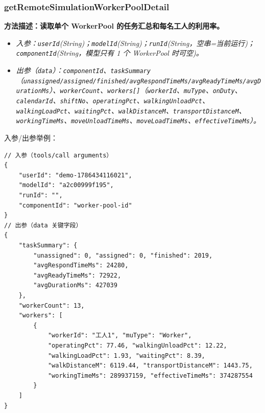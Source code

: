 \subsubsection{getRemoteSimulationWorkerPoolDetail}
\bf{方法描述}：读取单个 WorkerPool 的任务汇总和每名工人的利用率。
\begin{itemize}
	\item \it{入参}：\texttt{userId}(String)；\texttt{modelId}(String)；\texttt{runId}(String，空串=当前运行)；\texttt{componentId}(String，模型只有 1 个 WorkerPool 时可空)。
	\item \it{出参}（\texttt{data}）：\texttt{componentId}、\texttt{taskSummary}（\texttt{unassigned/assigned/finished/avgRespondTimeMs/avgReadyTimeMs/avgDurationMs}）、\texttt{workerCount}、\texttt{workers[]}（\texttt{workerId}、\texttt{muType}、\texttt{onDuty}、\texttt{calendarId}、\texttt{shiftNo}、\texttt{operatingPct}、\texttt{walkingUnloadPct}、\texttt{walkingLoadPct}、\texttt{waitingPct}、\texttt{walkDistanceM}、\texttt{transportDistanceM}、\texttt{workingTimeMs}、\texttt{moveUnloadTimeMs}、\texttt{moveLoadTimeMs}、\texttt{effectiveTimeMs}）。
\end{itemize}
入参/出参举例：
\begin{lstlisting}
// 入参（tools/call arguments）
{
    "userId": "demo-1786434116021",
    "modelId": "a2c00999f195",
    "runId": "",
    "componentId": "worker-pool-id"
}
// 出参（data 关键字段）
{
    "taskSummary": {
        "unassigned": 0, "assigned": 0, "finished": 2019,
        "avgRespondTimeMs": 24280,
        "avgReadyTimeMs": 72922,
        "avgDurationMs": 427039
    },
    "workerCount": 13,
    "workers": [
        {
            "workerId": "工人1", "muType": "Worker",
            "operatingPct": 77.46, "walkingUnloadPct": 12.22,
            "walkingLoadPct": 1.93, "waitingPct": 8.39,
            "walkDistanceM": 6119.44, "transportDistanceM": 1443.75,
            "workingTimeMs": 289937159, "effectiveTimeMs": 374287554
        }
    ]
}
\end{lstlisting}\vspace{-30pt}

